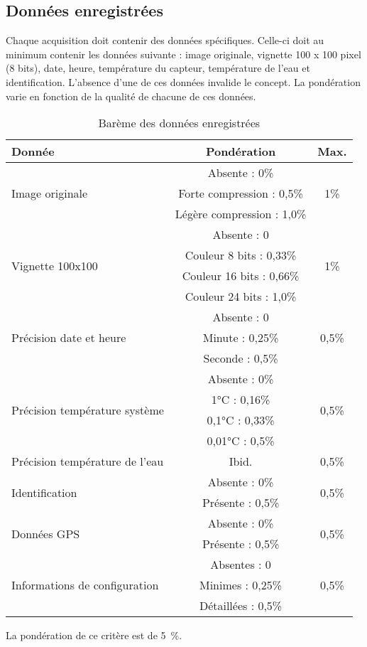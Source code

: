 

\subsection{Données enregistrées}
\label{s:cdc_pdd_donnees_enre}

Chaque acquisition doit contenir des données spécifiques.
Celle-ci doit au minimum contenir les données suivante : image originale, vignette 100 x 100 pixel (8 bits), date, heure, température du capteur, température de l’eau et identification.
L’absence d’une de ces données invalide le concept.
La pondération varie en fonction de la qualité de chacune de ces données.


\begin{table}[htp]
	\caption{Barème des données enregistrées}
	\label{tab:cdc_pdd_donnees_enre}
	\centering
	\begin{tabular}{|l|c|c|}
		\hline
		Donnée & Pondération & Max. \\\hline
		\multirow{3}{*}{Image originale} & Absente : 0\% & \multirow{3}{*}{1\%} \\
		& Forte compression : 0,5\% & \\
		& Légère compression : 1,0\% & \\\hline
		\multirow{4}{*}{Vignette 100x100} & Absente : 0 & \multirow{4}{*}{1\%} \\
		& Couleur 8 bits : 0,33\% & \\
		& Couleur 16 bits : 0,66\% & \\
		& Couleur 24 bits : 1,0\% & \\\hline
		\multirow{3}{*}{Précision date et heure} & Absente : 0 & \multirow{3}{*}{0,5\%} \\
		& Minute : 0,25\% & \\
		& Seconde : 0,5\% & \\\hline
		\multirow{4}{*}{Précision température système} & Absente : 0\% & \multirow{4}{*}{0,5\%} \\
		& 1°C : 0,16\% & \\
		& 0,1°C : 0,33\% & \\
		& 0,01°C : 0,5\% & \\\hline
		Précision température de l’eau & Ibid. & 0,5\% \\\hline
		\multirow{2}{*}{Identification} & Absente : 0\% & \multirow{2}{*}{0,5\%} \\
		& Présente : 0,5\% & \\\hline
		\multirow{2}{*}{Données GPS} & Absente : 0\% & \multirow{2}{*}{0,5\%} \\
		& Présente : 0,5\% & \\\hline
		\multirow{3}{*}{Informations de configuration} & Absentes : 0 & \multirow{3}{*}{0,5\%} \\
		& Minimes : 0,25\% & \\
		& Détaillées : 0,5\% & \\\hline
	\end{tabular}
\end{table}

La pondération de ce critère est de 5~\%.